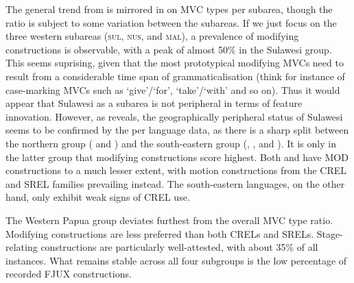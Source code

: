 The general trend from  is mirrored in  on MVC types per subarea, though the ratio is subject to some variation between the subareas. If we just focus on the three western subareas (\textsc{sul}, \textsc{nus}, and \textsc{mal}), a prevalence of modifying constructions is observable, with a peak of almost 50\% in the Sulawesi group. This seems suprising, given that the most prototypical modifying MVCs need to result from a considerable time span of grammaticalisation (think for instance of case-marking MVCs such as `give'/`for', `take'/`with' and so on). Thus it would appear that Sulawesi as a subarea is not peripheral in terms of feature innovation. However, as  reveals, the geographically peripheral status of Sulawesi seems to be confirmed by the per language data, as there is a sharp split between the northern group ( and ) and the south-eastern group (, , and ). It is only in the latter group that modifying constructions score highest. Both  and  have MOD constructions to a much lesser extent, with motion constructions from the CREL and SREL families prevailing instead. The south-eastern languages, on the other hand, only exhibit weak signs of CREL use.

\largerpage[1]
The Western Papua group deviates furthest from the overall MVC type ratio. Modifying constructions are less preferred than both CRELs and SRELs. Stage-relating constructions are particularly well-attested, with about 35\% of all instances. What remains stable across all four subgroups is the low percentage of recorded FJUX constructions.

